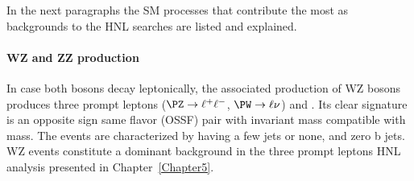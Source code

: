 In the next paragraphs the SM processes that contribute the most as 
backgrounds to the HNL searches are listed and explained.

\paragraph{WZ and ZZ production}\label{sec:c4wz_zz}
In case both bosons decay leptonically, the associated production of
WZ bosons produces three prompt leptons ($\PZ \rightarrow \ell^{+}
\ell^{-}$, $\PW \rightarrow \ell \nu$) and \ptmiss.
Its clear signature is an opposite sign same flavor (OSSF) pair with
invariant mass compatible with \PZ mass. The events are characterized by
having a few jets or none, and zero b jets.
WZ events
constitute a dominant background in the three prompt leptons HNL
analysis presented in Chapter~\ref{Chapter5}.

